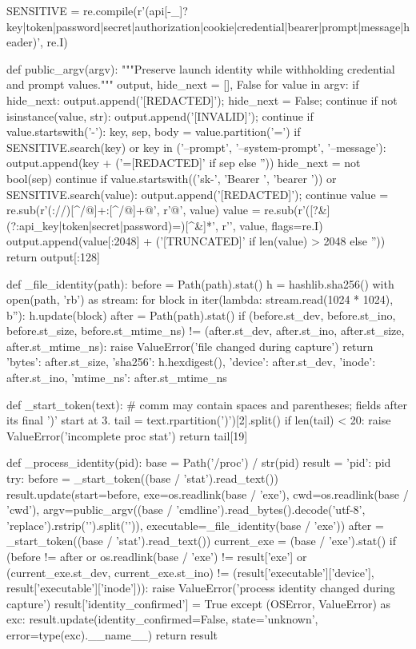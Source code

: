 SENSITIVE = re.compile(r'(api[-_]?key|token|password|secret|authorization|cookie|credential|bearer|prompt|message|header)', re.I)


def public_argv(argv):
    """Preserve launch identity while withholding credential and prompt values."""
    output, hide_next = [], False
    for value in argv:
        if hide_next:
            output.append('[REDACTED]'); hide_next = False; continue
        if not isinstance(value, str):
            output.append('[INVALID]'); continue
        if value.startswith('-'):
            key, sep, body = value.partition('=')
            if SENSITIVE.search(key) or key in ('--prompt', '--system-prompt', '--message'):
                output.append(key + ('=[REDACTED]' if sep else ''))
                hide_next = not bool(sep)
                continue
        if value.startswith(('sk-', 'Bearer ', 'bearer ')) or SENSITIVE.search(value):
            output.append('[REDACTED]'); continue
        value = re.sub(r'(://)[^/@\s]+:[^/@\s]+@', r'\1[REDACTED]@', value)
        value = re.sub(r'([?&](?:api_key|token|secret|password)=)[^&\s]*', r'\1[REDACTED]', value, flags=re.I)
        output.append(value[:2048] + ('[TRUNCATED]' if len(value) > 2048 else ''))
    return output[:128]


def _file_identity(path):
    before = Path(path).stat()
    h = hashlib.sha256()
    with open(path, 'rb') as stream:
        for block in iter(lambda: stream.read(1024 * 1024), b''): h.update(block)
    after = Path(path).stat()
    if (before.st_dev, before.st_ino, before.st_size, before.st_mtime_ns) != (after.st_dev, after.st_ino, after.st_size, after.st_mtime_ns):
        raise ValueError('file changed during capture')
    return {'bytes': after.st_size, 'sha256': h.hexdigest(),
            'device': after.st_dev, 'inode': after.st_ino, 'mtime_ns': after.st_mtime_ns}


def _start_token(text):
    # comm may contain spaces and parentheses; fields after its final ')' start at 3.
    tail = text.rpartition(')')[2].split()
    if len(tail) < 20: raise ValueError('incomplete proc stat')
    return tail[19]


def _process_identity(pid):
    base = Path('/proc') / str(pid)
    result = {'pid': pid}
    try:
        before = _start_token((base / 'stat').read_text())
        result.update(start=before, exe=os.readlink(base / 'exe'), cwd=os.readlink(base / 'cwd'),
            argv=public_argv((base / 'cmdline').read_bytes().decode('utf-8', 'replace').rstrip('\0').split('\0')),
            executable=_file_identity(base / 'exe'))
        after = _start_token((base / 'stat').read_text())
        current_exe = (base / 'exe').stat()
        if (before != after or os.readlink(base / 'exe') != result['exe']
                or (current_exe.st_dev, current_exe.st_ino) != (result['executable']['device'], result['executable']['inode'])):
            raise ValueError('process identity changed during capture')
        result['identity_confirmed'] = True
    except (OSError, ValueError) as exc:
        result.update(identity_confirmed=False, state='unknown', error=type(exc).__name__)
    return result


